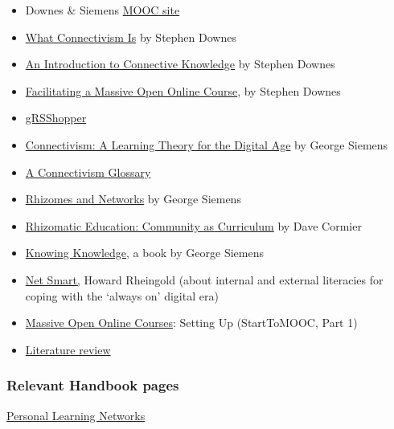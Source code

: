 \begin{itemize}
\item
  Downes \& Siemens \href{http://change.mooc.ca}{MOOC site}
\item
  \href{http://halfanhour.blogspot.com/2007/02/what-connectivism-is.html}{What
  Connectivism Is} by Stephen Downes
\item
  \href{http://www.downes.ca/post/33034}{An Introduction to Connective
  Knowledge} by Stephen Downes
\item
  \href{http://www.downes.ca/presentation/290}{Facilitating a Massive
  Open Online Course}, by Stephen Downes
\item
  \href{http://grsshopper.downes.ca/index.html}{gRSShopper}
\item
  \href{\%20http://www.elearnspace.org/Articles/connectivism.htm}{Connectivism:
  A Learning Theory for the Digital Age} by George Siemens
\item
  \href{http://en.wikiversity.org/wiki/Connectivism\_glossary}{A
  Connectivism Glossary}
\item
  \href{http://www.connectivism.ca/?p=329}{Rhizomes and Networks} by
  George Siemens
\item
  \href{http://innovateonline.info/pdf/vol4\_issue5/Rhizomatic\_Education-\_\_Community\_as\_Curriculum.pdf}{Rhizomatic
  Education: Community as Curriculum} by Dave Cormier
\item
  \href{http://www.amazon.ca/Knowing-Knowledge-George-Siemens/dp/1430302305}{Knowing
  Knowledge}, a book by George Siemens
\item
  \href{http://www.amazon.com/Net-Smart-ebook/dp/B007D5UP9G}{Net Smart,}
  Howard Rheingold (about internal and external literacies for coping
  with the `always on' digital era)
\item
  \href{http://www.learningsolutionsmag.com/articles/886/}{Massive Open
  Online Courses}: Setting Up (StartToMOOC, Part 1)
\item
  \href{https://docs.google.com/document/d/14GtDeiMkA61B7vPDSPGLfIzGumOyDhGIlLNcQCv0gec/edit}{Literature
  review}
\end{itemize}
\subsubsection{Relevant Handbook pages}

\href{http://socialmediaclassroom.com/host/peeragogy/wiki/personal-learning-networks}{Personal
Learning Networks}
